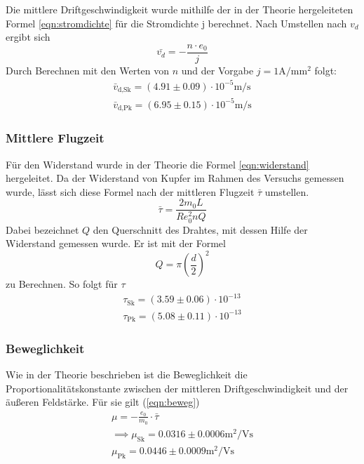 Die mittlere Driftgeschwindigkeit wurde mithilfe der in der Theorie hergeleiteten
Formel \eqref{eqn:stromdichte} für die Stromdichte j  berechnet. Nach Umstellen nach $v_d$ ergibt sich
\begin{equation*}
\bar{v_d} = - \frac{n \cdot e_0}{j} 
\end{equation*}
Durch Berechnen mit den Werten von $n$ und der Vorgabe $j = 1 \si{\ampere\per\milli\meter\squared}$
folgt:
\begin{align*}
\bar{v}_\text{d,Sk} = \left( 4.91 \pm 0.09 \right) \cdot 10^{-5} \si{\m\per\s}\\
\bar{v}_\text{d,Pk} = \left( 6.95 \pm 0.15 \right) \cdot 10^{-5} \si{\m\per\s}
\end{align*}

\subsubsection{Mittlere Flugzeit}

Für den Widerstand wurde in der Theorie die Formel \eqref{eqn:widerstand} hergeleitet. Da der Widerstand
von Kupfer im Rahmen des Versuchs gemessen wurde, lässt sich diese Formel nach
der mittleren Flugzeit $\bar{\tau}$ umstellen.
\begin{equation*}
\bar{\tau} = \frac{2 m_0 L}{R e_0^2 n Q}
\end{equation*}
Dabei bezeichnet $Q$ den Querschnitt des Drahtes, mit dessen Hilfe der Widerstand gemessen wurde.
Er ist mit der Formel
\begin{equation}
Q = \pi \left( \frac{d}{2} \right)^2
\end{equation}
zu Berechnen. So folgt für $\tau$
\begin{align*}
\tau_\text{Sk} = \left( 3.59 \pm 0.06 \right) \cdot 10^{-13}\\
\tau_\text{Pk} = \left( 5.08 \pm 0.11 \right) \cdot 10^{-13}
\end{align*}

\subsubsection{Beweglichkeit}

Wie in der Theorie beschrieben ist die Beweglichkeit die Proportionalitätskonstante zwischen 
der mittleren Driftgeschwindigkeit und der äußeren Feldstärke. Für sie gilt (\eqref{eqn:beweg})
\begin{align*}
\mu = -\frac{e_0}{m_0} \cdot \bar{\tau} \\
\implies \mu_\text{Sk} = 0.0316 \pm 0.0006 \si{\m\squared\per\V\s} \\
\mu_\text{Pk} = 0.0446 \pm 0.0009 \si{\m\squared\per\V\s}
\end{align*}

